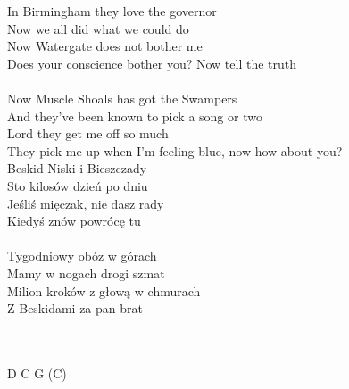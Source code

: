 \documentclass[a5paper, 10pt]{book}
\begin{document}
\begin{minipage}[t]{0.8\textwidth}
  In Birmingham they love the governor\\
  Now we all did what we could do\\
  Now Watergate does not bother me\\
  Does your conscience bother you? Now tell the truth\\
  \\
  Now Muscle Shoals has got the Swampers\\
  And they've been known to pick a song or two\\
  Lord they get me off so much\\
  They pick me up when I'm feeling blue, now how about you?\\

  \hspace*{6mm}Beskid Niski i Bieszczady\\
  \hspace*{6mm}Sto kilosów dzień po dniu\\
  \hspace*{6mm}Jeśliś mięczak, nie dasz rady\\
  \hspace*{6mm}Kiedyś znów powrócę tu\\
  \\
  \hspace*{6mm}Tygodniowy obóz w górach\\
  \hspace*{6mm}Mamy w nogach drogi szmat\\
  \hspace*{6mm}Milion kroków z głową w chmurach\\
  \hspace*{6mm}Z Beskidami za pan brat\\
  \\
  \\
\end{minipage}
\begin{minipage}[t]{0.2\textwidth}
  D C G (C)\\
\end{minipage}


\end{document}
